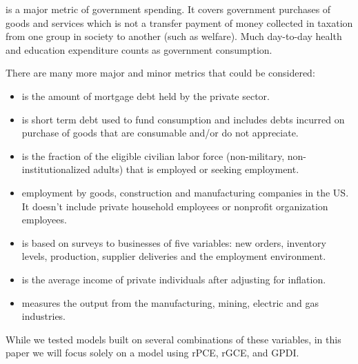      is a major metric of 
    government spending.  It covers government purchases of goods and services 
    which is not a transfer payment of money collected in taxation from one 
    group in society to another (such as welfare). Much day-to-day health and 
    education expenditure counts as government consumption. 

    There are many more major and minor metrics that could be considered:
    \begin{itemize}
        \item {} is the amount of mortgage debt held by the
        private sector. 
        \item {} is short term debt used to fund consumption and 
        includes debts incurred on purchase of goods that are consumable and/or do 
        not appreciate. 
        \item {}
        is the fraction of the eligible civilian labor force (non-military, 
        non-institutionalized adults) that is employed or seeking employment.
        \item {} employment by goods, construction 
        and manufacturing companies in the US. It doesn't include private household 
        employees or nonprofit organization employees. 
        \item {} is based on surveys to businesses of five 
        variables: new orders, inventory levels, production, supplier deliveries 
        and the employment environment. 
        \item {} is the average income of private individuals 
        after adjusting for inflation. 
        \item {} measures the output from the 
        manufacturing, mining, electric and gas industries.
    \end{itemize}
    
    While we tested models built on several combinations of these variables, in this
    paper we will focus solely on a model using rPCE, rGCE, and GPDI.
